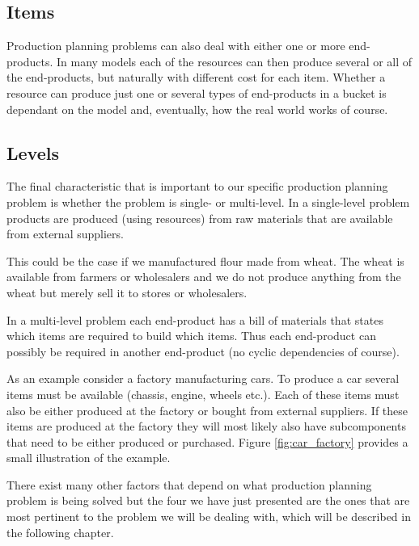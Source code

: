 \subsection{Items}
\label{sec:items}
Production planning problems can also deal with either one or more
end-products. In many models each of the resources can then produce
several or all of the end-products, but naturally with different cost
for each item. Whether a resource can produce just one or several
types of end-products in a bucket is dependant on the model and,
eventually, how the real world works of course.

\subsection{Levels}
\label{sec:levels}
The final characteristic that is important to our specific production
planning problem is whether the problem is single- or multi-level. 
In a single-level problem products are produced (using resources) from
raw materials that are available from external suppliers. 
\begin{example}
This could be the case if we manufactured flour made from wheat. The
wheat is available from farmers or wholesalers and we do not produce
anything from the wheat but merely sell it to stores or wholesalers.
\end{example}
In a multi-level problem each end-product has a bill of materials that
states which items are required to build which items. Thus each
end-product can possibly be required in another end-product (no cyclic
dependencies of course).
\begin{example}
As an example consider a factory manufacturing cars. To produce a car
several items must be available (chassis, engine, wheels etc.).  Each
of these items must also be either produced at the factory or bought
from external suppliers. If these items are produced at the factory
they will most likely also have subcomponents that need to be either
produced or purchased. Figure \ref{fig:car_factory} provides a small
illustration of the example.  
\end{example}

There exist many other factors that depend on what production planning
problem is being solved but the four we have just presented are the
ones that are most pertinent to the problem we will be dealing with,
which will be described in the following chapter.

